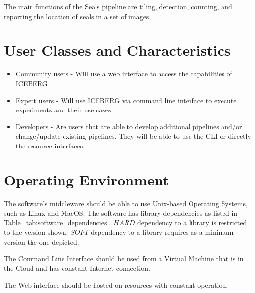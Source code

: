 \documentclass{scrreprt}
\begin{document}
The main functions of the Seals pipeline are tiling, detection, counting, and reporting 
the location of seals in a set of images.

\section{User Classes and Characteristics}

\begin{itemize}
	\item Community users - Will use a web interface to access the capabilities
	of ICEBERG
	\item Expert users - Will use ICEBERG via command line interface to execute 
	experiments and their use cases.
	\item Developers - Are users that are able to develop additional pipelines 
	and/or change/update existing pipelines. They will be able to use the CLI or 
	directly the resource interfaces.
\end{itemize}

\section{Operating Environment}

The software's middleware should be able to use Unix-based Operating Systems, such 
as Linux and MacOS. The software has library dependencies as listed in 
Table~\ref{tab:software_dependencies}. $HARD$ dependency to a library is restricted 
to the version shown. $SOFT$ dependency to a library requires as a minimum version 
the one depicted.

The Command Line Interface should be used from a Virtual Machine that is in the 
Cloud and has constant Internet connection.

The Web interface should be hosted on resources with constant operation.
\end{document}
